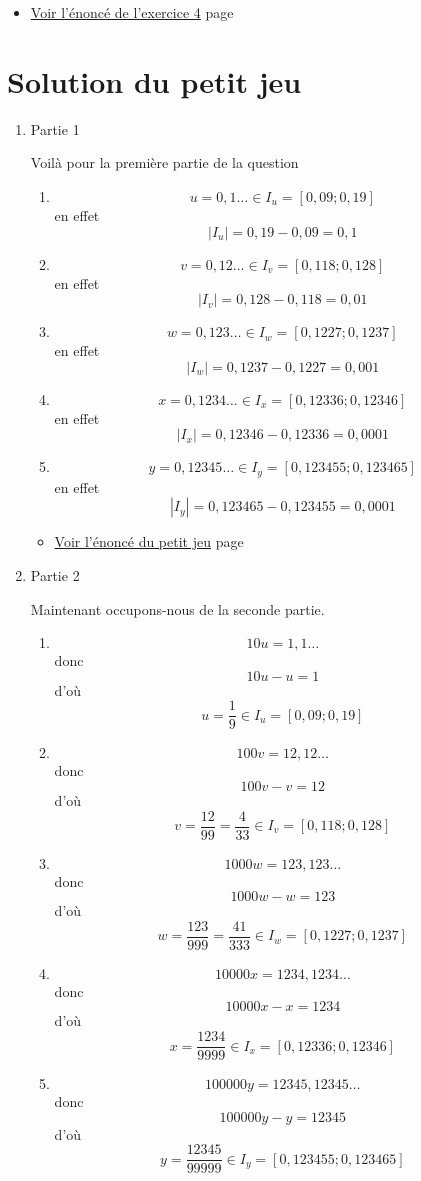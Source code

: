 \documentclass[a4paper,11pt]{book}
\begin{document}
\begin{itemize}
\item \hyperref[org6c6db0c]{Voir l'énoncé de l'exercice 4}
page~\pageref{page:sec2.2.3exo4}
\end{itemize}


\clearpage

\section{Solution du petit jeu}
\label{sec:orgcd21d5e}
\label{org727e50c}
\label{page:sec8.2.3sol-game}
\clearpage

\begin{enumerate}
\item Partie 1
\label{sec:orgb463b7d}

Voilà pour la première partie de la question

\begin{enumerate}
\item \[u = 0,1\dots\in I_u = [0,09 ; 0,19]\] en effet \[|I_u| =
      0,19 - 0,09 = 0,1\]
\item \[v = 0,12\dots\in I_v = [0,118 ; 0,128]\] en effet \[|I_v| =
      0,128 - 0,118 = 0,01\]
\item \[w = 0,123\dots\in I_w = [0,1227 ; 0,1237]\] en effet \[|I_w| =
      0,1237 - 0,1227 = 0,001\]
\item \[x = 0,1234\dots\in I_x = [0,12336 ; 0,12346]\] en effet
\[|I_x| = 0,12346 - 0,12336 = 0,0001\]
\item \[y = 0,12345\dots\in I_y = [0,123455 ; 0,123465]\] en effet
\[|I_y| = 0,123465 - 0,123455 = 0,0001\]
\end{enumerate}


\begin{itemize}
\item \hyperref[org2b18515]{Voir l'énoncé du petit jeu}
page~\pageref{page:sec2.2.4small-game}
\end{itemize}

\clearpage

\item Partie 2
\label{sec:org8b32679}

Maintenant occupons-nous de la seconde partie.

\begin{enumerate}
\item \[10u = 1,1\dots\] donc \[10u - u = 1\] d'où \[u =
      \dfrac{1}{9}\in I_u = [0,09 ; 0,19]\]
\item \[100v = 12,12\dots\] donc \[100v - v = 12\] d'où \[v =
      \dfrac{12}{99} = \dfrac{4}{33}\in I_v = [0,118 ; 0,128]\]
\item \[1000w = 123,123\dots\] donc \[1000w - w = 123\] d'où \[w =
      \dfrac{123}{999} = \dfrac{41}{333}\in I_w = [0,1227 ; 0,1237]\]
\item \[10000x = 1234,1234\dots\] donc \[10000x - x = 1234\] d'où \[x
      = \dfrac{1234}{9999}\in I_x = [0,12336 ; 0,12346]\]
\item \[100000y = 12345,12345\dots\] donc \[100000y - y = 12345\] d'où
\[y = \dfrac{12345}{99999}\in I_y = [0,123455 ; 0,123465]\]
\end{enumerate}




\end{enumerate}
\end{document}

